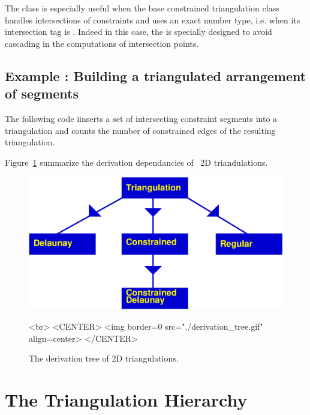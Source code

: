 The class 
is especially useful when the base constrained triangulation class
handles intersections of constraints and uses an exact number type,
i.e. when its intersection tag is .
Indeed in this case, the 
is specially designed to avoid cascading in the computations of
intersection  points.

\subsection{Example : Building a triangulated arrangement of segments}

The following code iinserts a set of intersecting constraint segments
into a triangulation 
and counts the number of constrained edges of the
resulting triangulation.



Figure~\ref{I1_Fig_derivation_tree}  summarize the derivation dependancies
of \cgal\ 2D triandulations.

\begin{figure}
\begin{ccTexOnly}
\begin{center}
\includegraphics[width=13cm]{derivation_tree.eps} 
\end{center}
\end{ccTexOnly}
\caption{The derivation tree of 2D triangulations.}
\label{I1_Fig_derivation_tree}
\begin{ccHtmlOnly}
<br>
<CENTER>
<img border=0 src="./derivation_tree.gif" align=center>
</CENTER>
\end{ccHtmlOnly}
\end{figure}


\section{The Triangulation Hierarchy}
\label{Section_2D_Triangulations_Hierarchy}


